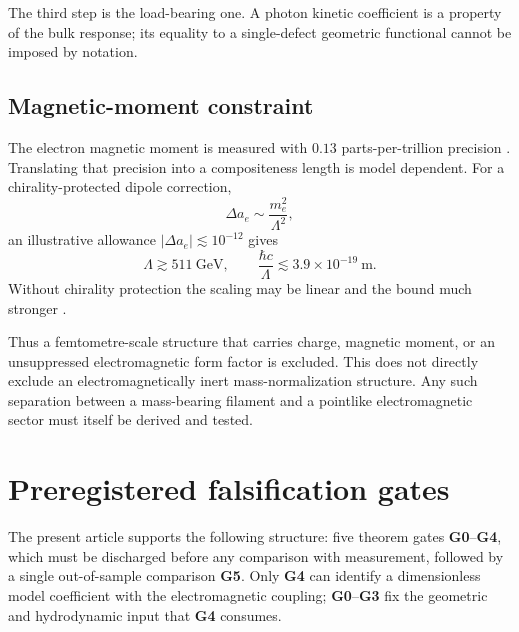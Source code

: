 \documentclass[aps,pre,preprint,notitlepage,nofootinbib,superscriptaddress]{revtex4-2}
\begin{document}
The third step is the load-bearing one.  A photon kinetic coefficient is a property of the bulk response; its equality to a single-defect geometric functional cannot be imposed by notation.

\subsection{Magnetic-moment constraint}

The electron magnetic moment is measured with \(0.13\) parts-per-trillion precision \cite{Fan2023}.  Translating that precision into a compositeness length is model dependent.  For a chirality-protected dipole correction,
\begin{equation}
  \Delta a_e
  \sim
  \frac{m_e^2}{\Lambda^2},
\end{equation}
an illustrative allowance \(|\Delta a_e|\lesssim10^{-12}\) gives
\begin{equation}
  \Lambda\gtrsim511\ \mathrm{GeV},
  \qquad
  \frac{\hbar c}{\Lambda}
  \lesssim3.9\times10^{-19}\ \mathrm m.
  \label{eq:gminus2-bound}
\end{equation}
Without chirality protection the scaling may be linear and the bound much stronger \cite{BrodskyDrell1980,GiudiceParadisiPassera2012}.

Thus a femtometre-scale structure that carries charge, magnetic moment, or an unsuppressed electromagnetic form factor is excluded.  This does not directly exclude an electromagnetically inert mass-normalization structure.  Any such separation between a mass-bearing filament and a pointlike electromagnetic sector must itself be derived and tested.

\section{Preregistered falsification gates}
\label{sec:programme}

The present article supports the following structure: five theorem gates \textbf{G0}--\textbf{G4}, which must be discharged before any comparison with measurement, followed by a single out-of-sample comparison \textbf{G5}.  Only \textbf{G4} can identify a dimensionless model coefficient with the electromagnetic coupling; \textbf{G0}--\textbf{G3} fix the geometric and hydrodynamic input that \textbf{G4} consumes.
\end{document}
